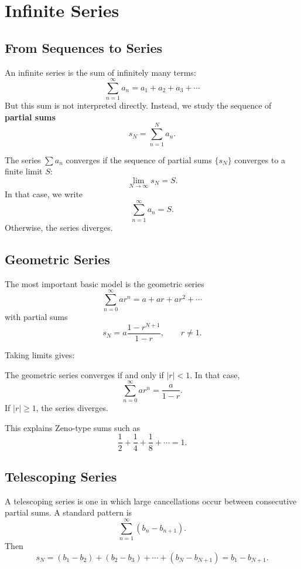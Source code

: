 \chapter*{Infinite Series}

\section*{From Sequences to Series}

An infinite series is the sum of infinitely many terms:
$$\sum_{n=1}^{\infty} a_n = a_1+a_2+a_3+\cdots$$
But this sum is not interpreted directly. Instead, we study the sequence of \textbf{partial sums}
$$s_N = \sum_{n=1}^{N} a_n.$$ 

\begin{definition}
The series $\sum a_n$ converges if the sequence of partial sums $\{s_N\}$ converges to a finite limit $S$:
$$\lim_{N\to\infty} s_N = S.$$ 
In that case, we write
$$\sum_{n=1}^{\infty} a_n = S.$$ 
Otherwise, the series diverges.
\end{definition}

\section*{Geometric Series}

The most important basic model is the geometric series
$$\sum_{n=0}^{\infty} ar^n = a+ar+ar^2+\cdots$$
with partial sums
$$s_N = a\frac{1-r^{N+1}}{1-r}, \qquad r\neq 1.$$ 

Taking limits gives:
\begin{theorem}
The geometric series converges if and only if $|r|<1$. In that case,
$$\sum_{n=0}^{\infty} ar^n = \frac{a}{1-r}.$$ 
If $|r|\ge 1$, the series diverges.
\end{theorem}

This explains Zeno-type sums such as
$$\frac12+\frac14+\frac18+\cdots = 1.$$ 

\section*{Telescoping Series}

A telescoping series is one in which large cancellations occur between consecutive partial sums. A standard pattern is
$$\sum_{n=1}^{\infty}(b_n-b_{n+1}).$$
Then
$$s_N = (b_1-b_2)+(b_2-b_3)+\cdots+(b_N-b_{N+1}) = b_1-b_{N+1}.$$ 

